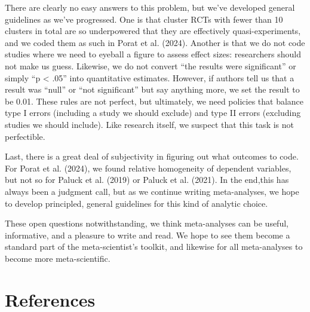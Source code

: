 \documentclass[
  ,jou]{apa6}
\begin{document}
There are clearly no easy answers to this problem, but we've developed general guidelines as we've progressed. One is that cluster RCTs with fewer than 10 clusters in total are so underpowered that they are effectively quasi-experiments, and we coded them as such in Porat et al. (2024). Another is that we do not code studies where we need to eyeball a figure to assess effect sizes: researchers should not make us guess. Likewise, we do not convert ``the results were significant'' or simply ``p \textless{} .05'' into quantitative estimates. However, if authors tell us that a result was ``null'' or ``not significant'' but say anything more, we set the result to be 0.01. These rules are not perfect, but ultimately, we need policies that balance type I errors (including a study we should exclude) and type II errors (excluding studies we should include). Like research itself, we suspect that this task is not perfectible.

Last, there is a great deal of subjectivity in figuring out what outcomes to code. For Porat et al. (2024), we found relative homogeneity of dependent variables, but not so for Paluck et al. (2019) or Paluck et al. (2021). In the end,this has always been a judgment call, but as we continue writing meta-analyses, we hope to develop principled, general guidelines for this kind of analytic choice.

These open questions notwithstanding, we think meta-analyses can be useful, informative, and a pleasure to write and read. We hope to see them become a standard part of the meta-scientist's toolkit, and likewise for all meta-analyses to become more meta-scientific.

\section*{References}\label{references}
\end{document}
